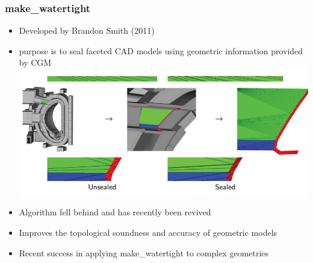 \documentclass[14pt]{beamer}
\begin{document}
\begin{frame}
\frametitle{make\_watertight}
\begin{itemize}
\item Developed by Brandon Smith (2011)
\item purpose is to seal faceted CAD models using geometric information provided by CGM
\vfill
\includegraphics[scale=0.4, trim = 80 0 0 0]{sealing_ex.png}
\end{itemize}
\end{frame}

\begin{frame}
\begin{itemize}
\frametitle{make\_watertight}
\item Algorithm fell behind and has recently been revived
\item Improves the topological soundness and accuracy of geometric models
\item Recent success in applying make\_watertight to complex geometries
\end{itemize}
\end{frame}
\end{document}
